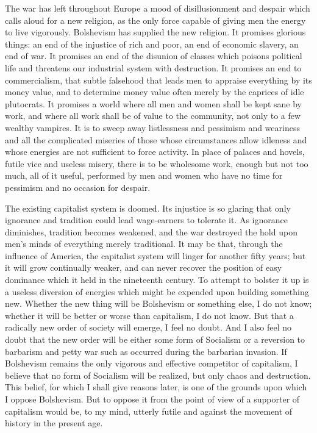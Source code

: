 The war has left throughout Europe a mood of disillusionment and despair which calls aloud for a new religion, as the only force capable of giving men the energy to live vigorously. Bolshevism has supplied the new religion. It promises glorious things: an end of the injustice of rich and poor, an end of economic slavery, an end of war. It promises an end of the disunion of classes which poisons political life and threatens our industrial system with destruction. It promises an end to commercialism, that subtle falsehood that leads men to appraise everything by its money value, and to determine money value often merely by the caprices of idle plutocrats. It promises a world where all men and women shall be kept sane by work, and where all work shall be of value to the community, not only to a few wealthy vampires. It is to sweep away listlessness and pessimism and weariness and all the complicated miseries of those whose circumstances allow idleness and whose energies are not sufficient to force activity. In place of palaces and hovels, futile vice and useless misery, there is to be wholesome work, enough but not too much, all of it useful, performed by men and women who have no time for pessimism and no occasion for despair.

The existing capitalist system is doomed. Its injustice is so glaring that only ignorance and tradition could lead wage-earners to tolerate it. As ignorance diminishes, tradition becomes weakened, and the war destroyed the hold upon men's minds of everything merely traditional. It may be that, through the influence of America, the capitalist system will linger for another fifty years; but it will grow continually weaker, and can never recover the position of easy dominance which it held in the nineteenth century. To attempt to bolster it up is a useless diversion of energies which might be expended upon building something new. Whether the new thing will be Bolshevism or something else, I do not know; whether it will be better or worse than capitalism, I do not know. But that a radically new order of society will emerge, I feel no doubt. And I also feel no doubt that the new order will be either some form of Socialism or a reversion to barbarism and petty war such as occurred during the barbarian invasion. If Bolshevism remains the only vigorous and effective competitor of capitalism, I believe that no form of Socialism will be realized, but only chaos and destruction. This belief, for which I shall give reasons later, is one of the grounds upon which I oppose Bolshevism. But to oppose it from the point of view of a supporter of capitalism would be, to my mind, utterly futile and against the movement of history in the present age.

